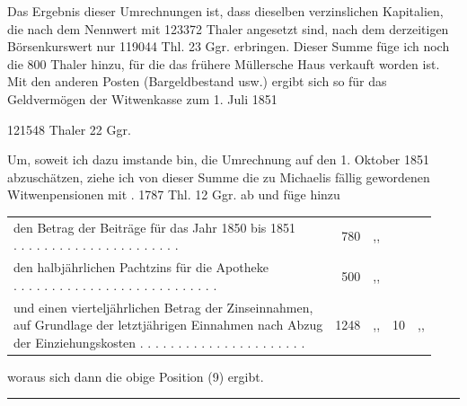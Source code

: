 Das Ergebnis dieser Umrechnungen ist, dass dieselben verzinslichen Kapitalien, die nach dem Nennwert mit 123372 Thaler angesetzt sind, nach dem derzeitigen Börsenkurswert nur 119044 Thl. 23 Ggr. erbringen. Dieser Summe füge ich noch die 800 Thaler hinzu, für die das frühere Müllersche Haus verkauft worden ist. Mit den anderen Posten (Bargeldbestand usw.) ergibt sich so für das Geldvermögen der Witwenkasse zum 1. Juli 1851
\begin{center}121548 Thaler 22 Ggr.\end{center}
\noindent\hspace*{\parindent}Um, soweit ich dazu imstande bin, die Umrechnung auf den 1. Oktober 1851 abzuschätzen, ziehe ich von dieser Summe die zu Michaelis fällig gewordenen Witwenpensionen mit . 1787 Thl. 12 Ggr. ab und füge hinzu
\begin{center}
\small\setlength{\tabcolsep}{2pt}
\begin{tabular}{l r l r l}
\shortstack[l]{den Betrag der Beiträge für das Jahr 1850 bis 1851\\. . . . . . . . . . . . . . . . . . . . . .}&780&,,&&\\
\shortstack[l]{den halbjährlichen Pachtzins für die Apotheke\\. . . . . . . . . . . . . . . . . . . . . . . . . . .}&500&,,&&\\
\shortstack[l]{und einen vierteljährlichen Betrag der Zinseinnahmen,\\auf Grundlage der letztjährigen Einnahmen nach Abzug\\der Einziehungskosten . . . . . . . . . . . . . . . . . . . . . .}&1248&,,&10&,,
\end{tabular}
\end{center}
\noindent woraus sich dann die obige Position (9) ergibt.

\begin{center}\rule{.28\linewidth}{.3pt}\end{center}
